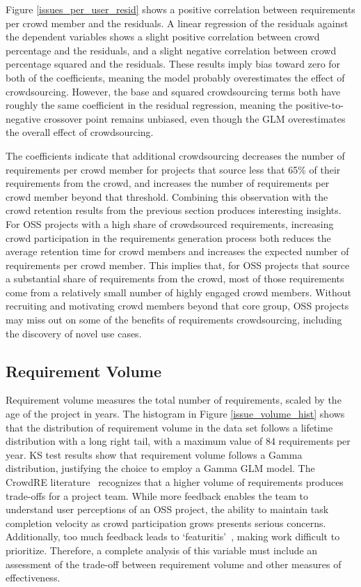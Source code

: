Figure \ref{issues_per_user_resid} shows a positive correlation between requirements per crowd member and the residuals. A linear regression of the residuals against the dependent variables shows a slight positive correlation between crowd percentage and the residuals, and a slight negative correlation between crowd percentage squared and the residuals. These results imply bias toward zero for both of the coefficients, meaning the model probably overestimates the effect of crowdsourcing. However, the base and squared crowdsourcing terms both have roughly the same coefficient in the residual regression, meaning the positive-to-negative crossover point remains unbiased, even though the GLM overestimates the overall effect of crowdsourcing.

The coefficients indicate that additional crowdsourcing decreases the number of requirements per crowd member for projects that source less that 65\% of their requirements from the crowd, and increases the number of requirements per crowd member beyond that threshold. Combining this observation with the crowd retention results from the previous section produces interesting insights. For OSS projects with a high share of crowdsourced requirements, increasing crowd participation in the requirements generation process both reduces the average retention time for crowd members and increases the expected number of requirements per crowd member. This implies that, for OSS projects that source a substantial share of requirements from the crowd, most of those requirements come from a relatively small number of highly engaged crowd members. Without recruiting and motivating crowd members beyond that core group, OSS projects may miss out on some of the benefits of requirements crowdsourcing, including the discovery of novel use cases.

\subsection{Requirement Volume}

Requirement volume measures the total number of requirements, scaled by the age of the project in years. The histogram in Figure \ref{issue_volume_hist} shows that the distribution of requirement volume in the data set follows a lifetime distribution with a long right tail, with a maximum value of 84 requirements per year. KS test results show that requirement volume follows a Gamma distribution, justifying the choice to employ a Gamma GLM model. The CrowdRE literature~\cite{groen} recognizes that a higher volume of requirements produces trade-offs for a project team. While more feedback enables the team to understand user perceptions of an OSS project, the ability to maintain task completion velocity as crowd participation grows presents serious concerns. Additionally, too much feedback leads to `featuritis'~\cite{glinz}, making work difficult to prioritize. Therefore, a complete analysis of this variable must include an assessment of the trade-off between requirement volume and other measures of effectiveness.

